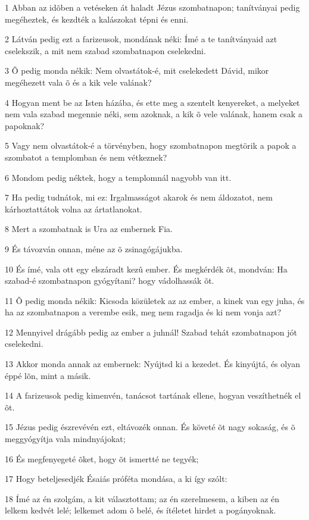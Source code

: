 \par 1 Abban az idõben a vetéseken át haladt Jézus szombatnapon; tanítványai pedig megéheztek, és kezdték a kalászokat tépni és enni.
\par 2 Látván pedig ezt a farizeusok, mondának néki: Ímé a te tanítványaid azt cselekszik, a mit nem szabad szombatnapon cselekedni.
\par 3 Õ pedig monda nékik: Nem olvastátok-é, mit cselekedett Dávid, mikor megéhezett vala õ és a kik vele valának?
\par 4 Hogyan ment be az Isten házába, és ette meg a szentelt kenyereket, a melyeket nem vala szabad megennie néki, sem azoknak, a kik õ vele valának, hanem csak  a papoknak?
\par 5 Vagy nem olvastátok-é a törvényben, hogy szombatnapon megtörik a papok a szombatot a templomban és nem vétkeznek?
\par 6 Mondom pedig néktek, hogy a templomnál nagyobb van itt.
\par 7 Ha pedig tudnátok, mi ez: Irgalmasságot akarok és nem áldozatot, nem kárhoztattátok volna az ártatlanokat.
\par 8 Mert a szombatnak is Ura az embernek Fia.
\par 9 És távozván onnan, méne az õ zsinagógájukba.
\par 10 És ímé, vala ott egy elszáradt kezû ember. És megkérdék õt, mondván: Ha szabad-é szombatnapon gyógyítani? hogy vádolhassák õt.
\par 11 Õ pedig monda nékik: Kicsoda közületek az az ember, a kinek van egy juha, és ha az szombatnapon a verembe esik, meg nem ragadja és ki nem vonja azt?
\par 12 Mennyivel drágább pedig az ember a juhnál! Szabad tehát szombatnapon jót cselekedni.
\par 13 Akkor monda annak az embernek: Nyújtsd ki a kezedet. És kinyújtá, és olyan éppé lõn, mint a másik.
\par 14 A farizeusok pedig kimenvén, tanácsot tartának ellene, hogyan veszíthetnék el õt.
\par 15 Jézus pedig észrevévén ezt, eltávozék onnan. És követé õt nagy sokaság, és õ meggyógyítja vala mindnyájokat;
\par 16 És megfenyegeté õket, hogy õt ismertté ne tegyék;
\par 17 Hogy beteljesedjék Ésaiás próféta mondása, a ki így szólt:
\par 18 Ímé az én szolgám, a kit választottam; az én szerelmesem, a kiben az én lelkem kedvét lelé; lelkemet adom õ belé, és ítéletet hirdet a pogányoknak.
